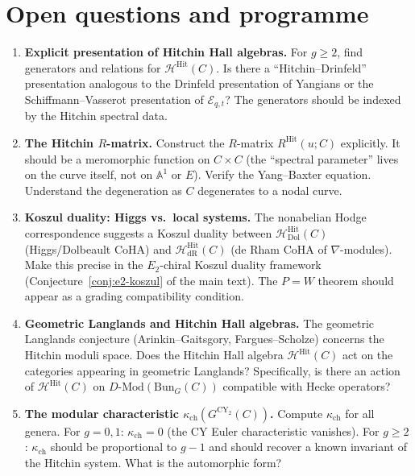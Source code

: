 \documentclass[11pt]{article}
\theoremstyle{garamondthm}
\theoremstyle{garamonddef}
\theoremstyle{garamondrem}
\newcommand{\Mod}{\mathrm{Mod}}
\newcommand{\CY}{\mathrm{CY}}
\newcommand{\Etwo}{E_2}
\newcommand{\cE}{\mathcal{E}}
\newcommand{\cH}{\mathcal{H}}
\newcommand{\Bun}{\mathrm{Bun}}
\newcommand{\Hit}{\mathrm{Hit}}
\begin{document}

\section{Open questions and programme}
\label{sec:open}

\begin{enumerate}[label=\textbf{Q\arabic*.}]

\item \textbf{Explicit presentation of Hitchin Hall algebras.} For $g \geq 2$, find generators and relations for $\cH^{\Hit}(C)$. Is there a ``Hitchin--Drinfeld'' presentation analogous to the Drinfeld presentation of Yangians or the Schiffmann--Vasserot presentation of $\cE_{q,t}$? The generators should be indexed by the Hitchin spectral data.

\item \textbf{The Hitchin $R$-matrix.} Construct the $R$-matrix $R^{\Hit}(u; C)$ explicitly. It should be a meromorphic function on $C \times C$ (the ``spectral parameter'' lives on the curve itself, not on $\mathbb{A}^1$ or $E$). Verify the Yang--Baxter equation. Understand the degeneration as $C$ degenerates to a nodal curve.

\item \textbf{Koszul duality: Higgs vs.\ local systems.} The nonabelian Hodge correspondence suggests a Koszul duality between $\cH^{\Hit}_{\mathrm{Dol}}(C)$ (Higgs/Dolbeault CoHA) and $\cH^{\Hit}_{\mathrm{dR}}(C)$ (de Rham CoHA of $\nabla$-modules). Make this precise in the $\Etwo$-chiral Koszul duality framework (Conjecture~\ref{conj:e2-koszul} of the main text). The $P = W$ theorem should appear as a grading compatibility condition.

\item \textbf{Geometric Langlands and Hitchin Hall algebras.} The geometric Langlands conjecture (Arinkin--Gaitsgory, Fargues--Scholze) concerns the Hitchin moduli space. Does the Hitchin Hall algebra $\cH^{\Hit}(C)$ act on the categories appearing in geometric Langlands? Specifically, is there an action of $\cH^{\Hit}(C)$ on $D\text{-}\Mod(\Bun_G(C))$ compatible with Hecke operators?

\item \textbf{The modular characteristic $\kappa_{\mathrm{ch}}(G^{\CY_2}(C))$.} Compute $\kappa_{\mathrm{ch}}$ for all genera. For $g = 0, 1$: $\kappa_{\mathrm{ch}} = 0$ (the CY Euler characteristic vanishes). For $g \geq 2$: $\kappa_{\mathrm{ch}}$ should be proportional to $g - 1$ and should recover a known invariant of the Hitchin system. What is the automorphic form?


\end{enumerate}
\end{document}
